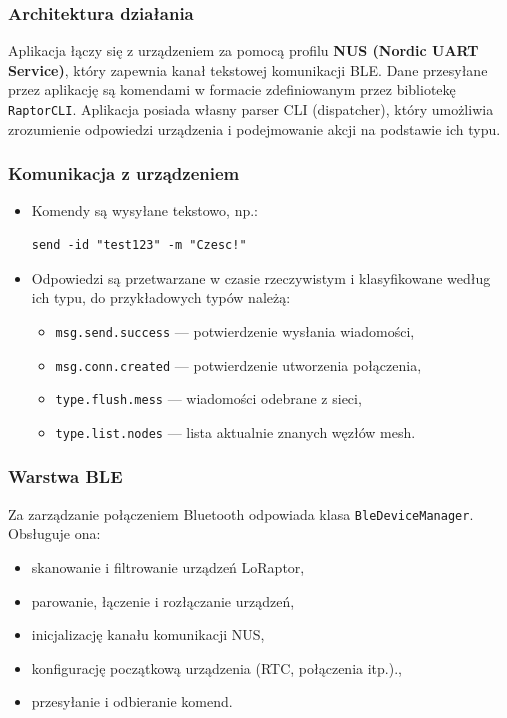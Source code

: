 \clearpage
\subsubsection{Architektura działania}

Aplikacja łączy się z urządzeniem za pomocą profilu \textbf{NUS (Nordic UART Service)}, który zapewnia kanał tekstowej komunikacji BLE. Dane przesyłane przez aplikację są komendami w formacie zdefiniowanym przez bibliotekę \texttt{RaptorCLI}. Aplikacja posiada własny parser CLI (dispatcher), który umożliwia zrozumienie odpowiedzi urządzenia i podejmowanie akcji na podstawie ich typu.

\clearpage
\subsubsection{Komunikacja z urządzeniem}

\begin{itemize}
	\item Komendy są wysyłane tekstowo, np.:
		\begin{lstlisting}
send -id "test123" -m "Czesc!"
		\end{lstlisting}
	\item Odpowiedzi są przetwarzane w czasie rzeczywistym i klasyfikowane według ich typu, do przykładowych typów należą:
		\begin{itemize}
			\item \texttt{msg.send.success} --- potwierdzenie wysłania wiadomości,
			\item \texttt{msg.conn.created} --- potwierdzenie utworzenia połączenia,
			\item \texttt{type.flush.mess} --- wiadomości odebrane z sieci,
			\item \texttt{type.list.nodes} --- lista aktualnie znanych węzłów mesh.
		\end{itemize}
\end{itemize}

\subsubsection{Warstwa BLE}

Za zarządzanie połączeniem Bluetooth odpowiada klasa \texttt{BleDeviceManager}. Obsługuje ona:
\begin{itemize}
	\item skanowanie i filtrowanie urządzeń LoRaptor,
	\item parowanie, łączenie i rozłączanie urządzeń,
	\item inicjalizację kanału komunikacji NUS,
	\item konfigurację początkową urządzenia (RTC, połączenia itp.).,
	\item przesyłanie i odbieranie komend.
\end{itemize}

